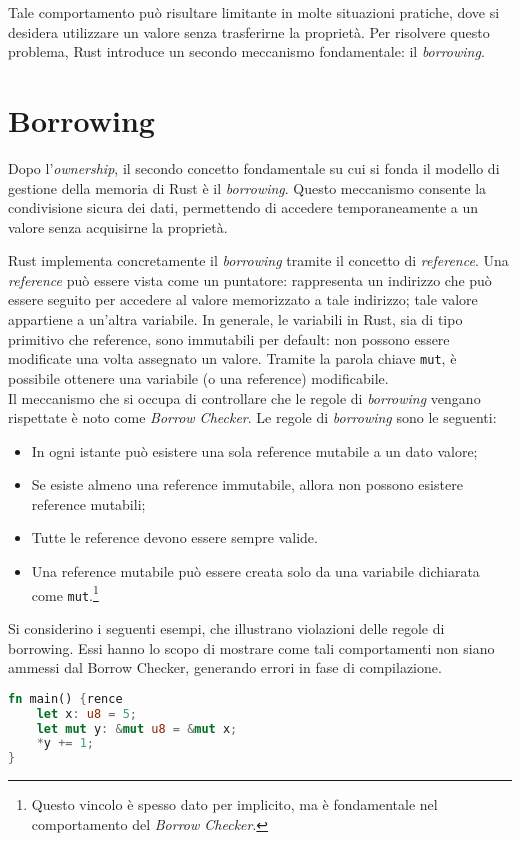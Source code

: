 Tale comportamento può risultare limitante in molte situazioni pratiche, dove si desidera utilizzare un valore senza trasferirne la proprietà. Per risolvere questo problema, Rust introduce un secondo meccanismo fondamentale: il \textit{borrowing}.

\section{Borrowing}
Dopo l'\textit{ownership}, il secondo concetto fondamentale su cui si fonda il modello di gestione della memoria di Rust è il \textit{borrowing}. Questo meccanismo consente la condivisione sicura dei dati, permettendo di accedere temporaneamente a un valore senza acquisirne la proprietà.

Rust implementa concretamente il \textit{borrowing} tramite il concetto di \textit{reference}. Una \textit{reference} può essere vista come un puntatore: rappresenta un indirizzo che può essere seguito per accedere al valore memorizzato a tale indirizzo; tale valore appartiene a un'altra variabile.
\break  \break
\noindent In generale, le variabili in Rust, sia di tipo primitivo che reference, sono immutabili per default: non possono essere modificate una volta assegnato un valore. Tramite la parola chiave \texttt{mut}, è possibile ottenere una variabile (o una reference) modificabile. \hfill
\vspace{10pt}\\
\noindent Il meccanismo che si occupa di controllare che le regole di \textit{borrowing} vengano rispettate è noto come \textit{Borrow Checker}. Le regole di \textit{borrowing} sono le seguenti:
\begin{itemize}
    \item In ogni istante può esistere una sola reference mutabile a un dato valore;
    \item Se esiste almeno una reference immutabile, allora non possono esistere reference mutabili;
    \item Tutte le reference devono essere sempre valide.
    \item Una reference mutabile può essere creata solo da una variabile dichiarata come \texttt{mut}.\footnote{Questo vincolo è spesso dato per implicito, ma è fondamentale nel comportamento del \textit{Borrow Checker}.}
\end{itemize}
Si considerino i seguenti esempi, che illustrano violazioni delle regole di borrowing. Essi hanno lo scopo di mostrare come tali comportamenti non siano ammessi dal Borrow Checker, generando errori in fase di compilazione.
\begin{lstlisting}[language=Rust, caption={Refe mutabile a variabile immutabile}, label={borrow:mut-from-unmut}]
fn main() {rence
    let x: u8 = 5;
    let mut y: &mut u8 = &mut x;
    *y += 1;
}
\end{lstlisting}

